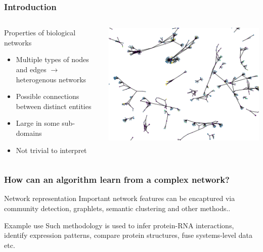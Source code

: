 \documentclass{beamer}
\begin{document}
\begin{frame}\frametitle{Introduction} 


  \begin{columns}
    \begin{column}{0.5\textwidth}

  \begin{block}{Properties of biological networks}
    \begin{itemize}

    \item Multiple types of nodes and edges $\rightarrow$ heterogenous networks
    \item Possible connections between distinct entities
    \item Large in some sub-domains
    \item Not trivial to interpret
      
    \end{itemize}
  \end{block}
      \end{column}
    \begin{column}{0.5\textwidth}  %
      \begin{center}
        \includegraphics[width=1\textwidth]{images/figure_2}
      \end{center}
    \end{column}
    \end{columns}
  \end{frame}

  \begin{frame}\frametitle{How can an algorithm learn from a complex network?}

    \begin{block}{Network representation}
      Important network features can be encaptured via community detection, graphlets, semantic clustering and other methods..
    \end{block}

    \begin{exampleblock}{Example use}
      Such methodology is used to infer protein-RNA interactions, identify expression patterns, compare protein structures, fuse systems-level data etc.
    \end{exampleblock}
    
  \end{frame}
  
\end{document}
